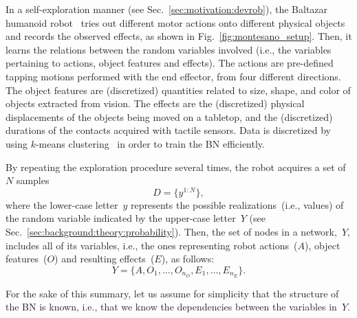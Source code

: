 In a self-exploration manner (see Sec.~\ref{sec:motivation:devrob}), the Baltazar humanoid robot~\cite{lopes:2004:baltazar} tries out different motor actions onto different physical objects and records the observed effects, as shown in Fig.~\ref{fig:montesano_setup}.
Then, it learns the relations between the random variables involved (i.e., the variables pertaining to actions, object features and effects).
The actions are pre-defined tapping motions performed with the end effector, from four different directions.
The object features are (discretized) quantities related to size, shape, and color of objects extracted from vision.
The effects are the (discretized) physical displacements of the objects being moved on a tabletop, and the (discretized) durations of the contacts acquired with tactile sensors.
Data is discretized by using $k$-means clustering~\cite{lloyd:1982:kmeans} in order to train the \ac{BN} efficiently.

By repeating the exploration procedure several times, the robot acquires a set of~$N$ samples
\begin{equation}
    D = \{ y^{1:N} \},
\end{equation}
where the lower-case letter~$y$ represents the possible realizations~(i.e., values) of the random variable indicated by the upper-case letter~$Y$ (see Sec.~\ref{sec:background:theory:probability}).
Then, the set of nodes in a network,~$Y$, includes all of its variables, i.e., the ones representing robot actions~($A$), object features~($O$) and resulting effects~($E$), as follows:
\begin{equation}
    Y = \{ A, O_1,\dots,O_{n_O}, E_1,\dots,E_{n_E} \}.
\end{equation}

For the sake of this summary, let us assume for simplicity that the structure of the \ac{BN} is known, i.e., that we know the dependencies between the variables in~$Y$.

